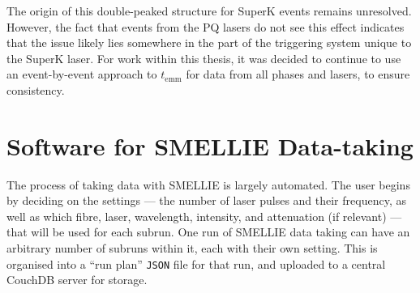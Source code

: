 The origin of this double-peaked structure for SuperK events remains unresolved. However, the fact that events from the PQ lasers do not see this effect indicates that the issue likely lies somewhere in the part of the triggering system unique to the SuperK laser. For work within this thesis, it was decided to continue to use an event-by-event approach to $t_{\mathrm{emm}}$ for data from all phases and lasers, to ensure consistency.


\section{Software for SMELLIE Data-taking}
The process of taking data with SMELLIE is largely automated. The user begins by deciding on the settings --- the number of laser pulses and their frequency, as well as which fibre, laser, wavelength, intensity, and attenuation (if relevant) --- that will be used for each subrun. One run of SMELLIE data taking can have an arbitrary number of subruns within it, each with their own setting. This is organised into a ``run plan'' \texttt{JSON} file for that run, and uploaded to a central CouchDB server for storage.

